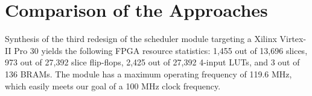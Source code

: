 \section{Comparison of the Approaches}
\label{sec:results3}

Synthesis of the third redesign of the scheduler module targeting a Xilinx
\cite{xilinx} Virtex-II Pro 30 yields the following FPGA resource statistics:
1,455 out of 13,696 slices, 973 out of 27,392 slice flip-flops, 2,425 out of
27,392 4-input LUTs, and 3 out of 136 BRAMs.  The module has a maximum
operating frequency of 119.6 MHz, which easily meets our goal of a 100 MHz
clock frequency.

